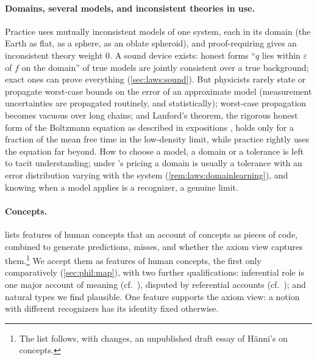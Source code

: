 \paragraph{Domains, several models, and inconsistent theories in use.}\label{sec:limits:domains}Practice uses mutually inconsistent models of one system, each in its domain (the Earth as flat, as a sphere, as an oblate spheroid), and proof-requiring \SAIabbr gives an inconsistent theory weight $0$. A sound device exists: honest forms ``$q$ lies within $\varepsilon$ of $f$ on the domain'' of true models are jointly consistent over a true background; exact ones can prove everything (\cref{sec:laws:sound}). But physicists rarely state or propagate worst-case bounds on the error of an approximate model (measurement uncertainties are propagated routinely, and statistically); worst-case propagation becomes vacuous over long chains; and Lanford's theorem, the rigorous honest form of the Boltzmann equation as described in expositions \citep{lanford1975time}, holds only for a fraction of the mean free time in the low-density limit, while practice rightly uses the equation far beyond. How to choose a model, a domain or a tolerance is left to tacit understanding; under \SAIabbr's pricing a domain is usually a tolerance with an error distribution varying with the system (\cref{rem:laws:domainlearning}), and knowing when a model applies is a recognizer, a genuine limit.

\paragraph{Concepts.}\label{sec:limits:concepts} lists features of human concepts that an account of concepts as pieces of code, combined to generate predictions, misses, and whether the axiom view captures them.\footnote{The list follows, with changes, an unpublished draft essay of H\"anni's on concepts.} We accept them as features of human concepts, the first only comparatively (\cref{sec:phil:map}), with two further qualifications: inferential role is one major account of meaning (cf.\ \citealp{sellars1953inference}), disputed by referential accounts (cf.\ \citealp{kripke1980naming}); and natural types we find plausible. One feature supports the axiom view: a notion with different recognizers has its identity fixed otherwise.

